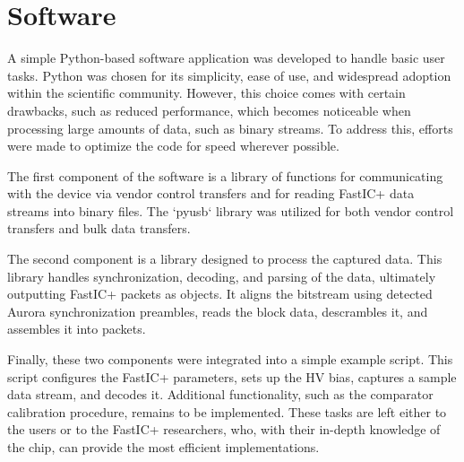 \chapter{Software}
A simple Python-based software application was developed to handle basic user tasks. Python was chosen for its simplicity, ease of use, and widespread adoption within the scientific community. However, this choice comes with certain drawbacks, such as reduced performance, which becomes noticeable when processing large amounts of data, such as binary streams. To address this, efforts were made to optimize the code for speed wherever possible.

The first component of the software is a library of functions for communicating with the device via vendor control transfers and for reading FastIC+ data streams into binary files. The `pyusb` library was utilized for both vendor control transfers and bulk data transfers.

The second component is a library designed to process the captured data. This library handles synchronization, decoding, and parsing of the data, ultimately outputting FastIC+ packets as objects. It aligns the bitstream using detected Aurora synchronization preambles, reads the block data, descrambles it, and assembles it into packets.

Finally, these two components were integrated into a simple example script. This script configures the FastIC+ parameters, sets up the HV bias, captures a sample data stream, and decodes it. Additional functionality, such as the comparator calibration procedure, remains to be implemented. These tasks are left either to the users or to the FastIC+ researchers, who, with their in-depth knowledge of the chip, can provide the most efficient implementations.
